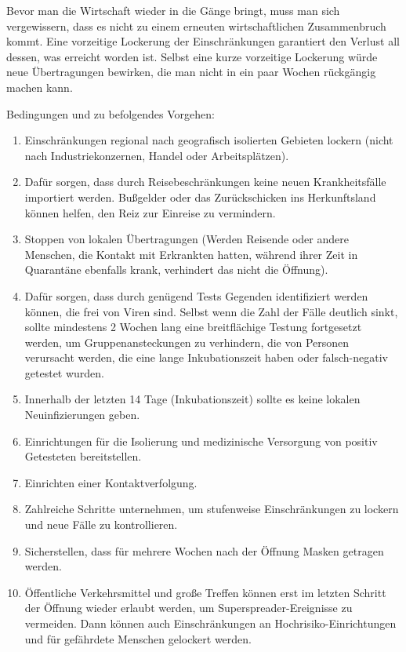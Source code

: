\documentclass[onecolumn,journal]{IEEEtran}
\begin{document}
\large
\begin{multicols}{2}

Bevor man die Wirtschaft wieder in die Gänge bringt, muss man sich vergewissern, dass es nicht zu einem erneuten wirtschaftlichen Zusammenbruch kommt. Eine vorzeitige Lockerung der Einschränkungen garantiert den Verlust all dessen, was erreicht worden ist. Selbst eine kurze vorzeitige Lockerung würde neue Übertragungen bewirken, die man nicht in ein paar Wochen rückgängig machen kann.

Bedingungen und zu befolgendes Vorgehen:
\begin{enumerate}
\item Einschränkungen regional nach geografisch isolierten Gebieten lockern (nicht nach Industriekonzernen, Handel oder Arbeitsplätzen).
\item Dafür sorgen, dass durch Reisebeschränkungen keine neuen Krankheitsfälle importiert werden. Bußgelder oder das Zurückschicken ins Herkunftsland können helfen, den Reiz zur Einreise zu vermindern.
\item Stoppen von lokalen Übertragungen (Werden Reisende oder andere Menschen, die Kontakt mit Erkrankten hatten, während ihrer Zeit in Quarantäne ebenfalls krank, verhindert das nicht die Öffnung).
\item Dafür sorgen, dass durch genügend Tests Gegenden identifiziert werden können, die frei von Viren sind. Selbst wenn die Zahl der Fälle deutlich sinkt, sollte mindestens 2 Wochen lang eine breitflächige Testung fortgesetzt werden, um Gruppenansteckungen zu verhindern, die von Personen verursacht werden, die eine lange Inkubationszeit haben oder falsch-negativ getestet wurden.
\item Innerhalb der letzten 14 Tage (Inkubationszeit) sollte es keine lokalen Neuinfizierungen geben.
\item Einrichtungen für die Isolierung und medizinische Versorgung von positiv Getesteten bereitstellen.
\item Einrichten einer Kontaktverfolgung.
\item Zahlreiche Schritte unternehmen, um stufenweise Einschränkungen zu lockern und neue Fälle zu kontrollieren.
\item Sicherstellen, dass für mehrere Wochen nach der Öffnung Masken getragen werden.
\item Öffentliche Verkehrsmittel und große Treffen können erst im letzten Schritt der Öffnung wieder erlaubt werden, um Superspreader-Ereignisse zu vermeiden. Dann können auch Einschränkungen an Hochrisiko-Einrichtungen und für gefährdete Menschen gelockert werden.
\end{enumerate}


\end{multicols}
\end{document}
